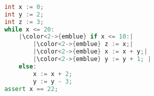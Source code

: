 \begin{lstlisting}[language=C++,basicstyle=\ttfamily,keywordstyle=\color{blue}, escapechar={|}]  % Start your code-block
	
	int x := 0;
	int y := 2;
	int z := 3;
	while x <= 20:
		|\color<2->{emblue} if x <= 10:|
			|\color<2->{emblue} z := x;|
			|\color<2->{emblue} x := x + y;|
			|\color<2->{emblue} y := y + 1; |
		else:
			x := x + 2;
			y := y - 3;
	assert x == 22;
	\end{lstlisting}